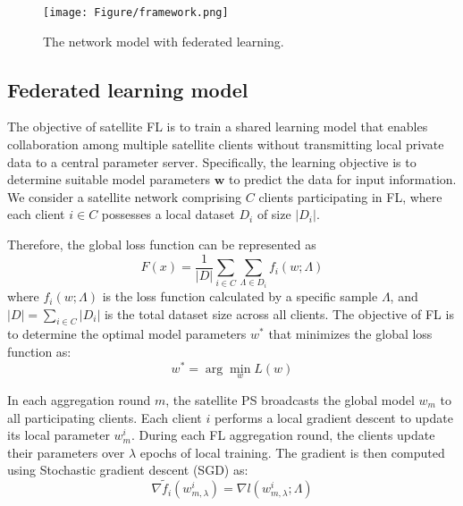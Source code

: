 \begin{figure}[tb!]
\centerline{\texttt{[image: Figure/framework.png]}}
\caption{The network model with federated learning.}
\label{fig:model}
\end{figure}



\subsection{Federated learning model}
The objective of satellite FL is to train a shared learning model that enables collaboration among multiple satellite clients without transmitting local private data to a central parameter server. Specifically, the learning objective is to determine suitable model parameters $\mathbf{w}$ to predict the data for input information. We consider a satellite network comprising $C$ clients participating in FL, where each client $i \in C$ possesses a local dataset $D_i$ of size $|D_i|$. 
\begin{comment}
The local loss function of satellite client $i$ on all its data is defined as: 
\begin{equation}
F_i(x) = \frac{1}{|D_i|} \sum_{\Lambda \in D_i} f_i(w; \Lambda)
\end{equation}
where $f_i(w; \Lambda)$ is the loss function calculated by a specific sample $\Lambda$. 
\end{comment}
Therefore, the global loss function can be represented as
\begin{equation}
F(x) = \frac{1}{|D|} \sum_{i \in C} \sum_{\Lambda \in D_i} f_i(w; \Lambda)
\end{equation}
where $f_i(w; \Lambda)$ is the loss function calculated by a specific sample $\Lambda$, and $|D|=\sum_{i \in C}|D_i| $ is the total dataset size across all clients. %
The objective of FL is to determine the optimal model parameters $w^*$ that minimizes the global loss function as: 
\begin{equation}
w^* = \arg \min_w L(w)
\end{equation}

In each aggregation round $m$, the satellite PS broadcasts the global model \(w_m\) to all participating clients. Each client $i$ performs a local gradient descent to update its local parameter \(w_m^i\). During each FL aggregation round, the clients update their parameters over $\lambda$ epochs of local training. The gradient is then computed using Stochastic gradient descent (SGD) as:
\begin{equation}
    \nabla \tilde f_i(w_{m,\lambda}^{i}) = \nabla  l(w_{m,\lambda}^{i}; \Lambda)
\end{equation} 



